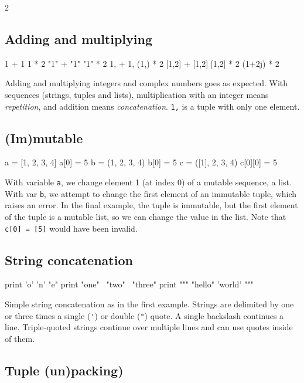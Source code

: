 \documentclass[draft=false]{article}
\newcommand{\answer}[1]{#1}%
\def\pythoni{\lstinline[language=pythontim]}
\begin{document}
\begin{multicols}{2}

\subsection{Adding and multiplying}

\begin{python}
1 + 1
1 * 2
"1" + "1"
"1" * 2
1, + 1,
(1,) * 2
[1,2] + [1,2]
[1,2] * 2
(1+2j) * 2
\end{python}
\answer{Adding and multiplying integers and complex numbers goes as expected. With sequences (strings, tuples and lists), multiplication with an integer means \emph{repetition}, and addition means \emph{concatenation}. \pythoni{1,} is a tuple with only one element.}
\subsection{(Im)mutable}

\begin{python}
a = [1, 2, 3, 4]
a[0] = 5
b = (1, 2, 3, 4)
b[0] = 5
c = ([1], 2, 3, 4)
c[0][0] = 5
\end{python}
\answer{With variable \pythoni{a}, we change element 1 (at index 0) of a mutable sequence, a list. With var \pythoni{b}, we attempt to change the first element of an immutable tuple, which raises an error. In the final example, the tuple is immutable, but the first element of the tuple is a mutable list, so we can change the value in the list. Note that \pythoni{c[0] = [5]} would have been invalid.}

\columnbreak

\subsection{String concatenation}
\begin{python}
print 'o' 'n' "e"
print "one" \
"two" \
"three"
print """
"hello"
'world'
"""
\end{python}

\answer{Simple string concatenation as in the first example. Strings are delimited by one or three times a single (\pythoni{'}) or double (\pythoni{"}) quote. A single backslash continues a line. Triple-quoted strings continue over multiple lines and can use quotes inside of them.}

\subsection{Tuple (un)packing)}


\end{multicols}
\end{document}

